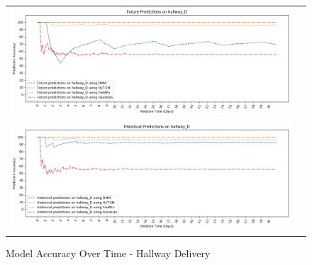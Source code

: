 \begin{figure}[!Hp]
  \begin{tabular}{cc}
    {\includegraphics[width = 6in]{images/results/Future_Predictions_on_hallway_D.png}} \\
    {\includegraphics[width = 6in]{images/results/Historical_Predictions_on_hallway_D.png}} \\
  \end{tabular}
  \caption{Model Accuracy Over Time - Hallway Delivery}
\end{figure}\\ \\


